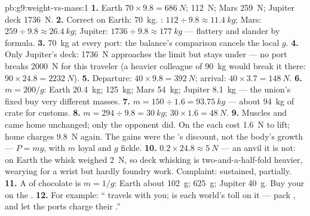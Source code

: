 \begin{solution}{pb:g9:weight-vs-mass:1}
\textbf{1.} Earth $70 \times 9.8 = \qty{686}{N}$; 
\qty{112}{N}; Mars \qty{259}{N}; Jupiter deck
\qty{1736}{N}.
\textbf{2.} Correct on Earth: \qty{70}{kg}. : $112 \div
9.8 \approx \qty{11.4}{kg}$; Mars: $259 \div 9.8 \approx
\qty{26.4}{kg}$; Jupiter: $1736 \div 9.8 \approx
\qty{177}{kg}$ --- flattery and slander by formula.
\textbf{3.} \qty{70}{kg} at every port: the balance's
comparison cancels the local $g$.
\textbf{4.} Only Jupiter's deck: \qty{1736}{N} approaches the
limit but stays under --- no port breaks \qty{2000}{N} for
this traveler (a heavier colleague of \qty{90}{kg} would
break it there: $90 \times 24.8 = \qty{2232}{N}$).
\textbf{5.} Departure: $40 \times 9.8 = \qty{392}{N}$;
arrival: $40 \times 3.7 = \qty{148}{N}$.
\textbf{6.} $m = 200/g$: Earth \qty{20.4}{kg}; 
\qty{125}{kg}; Mars \qty{54}{kg}; Jupiter \qty{8.1}{kg} ---
the union's fixed  buy very different masses.
\textbf{7.} $m = 150 \div 1.6 = \qty{93.75}{kg}$ --- about
\qty{94}{kg} of crate for customs.
\textbf{8.} $m = 294 \div 9.8 = \qty{30}{kg}$;  
$30 \times 1.6 = \qty{48}{N}$.
\textbf{9.} Muscles and  came home unchanged; only the
opponent did. On the  each  cost \qty{1.6}{N} to
lift; home charges \qty{9.8}{N} again. The gains were the
's discount, not the body's growth --- $P = m g$, with
$m$ loyal and $g$ fickle.
\textbf{10.} $0.2 \times 24.8 \approx \qty{5}{N}$ --- an
anvil it is not: on Earth the whisk weighed \qty{2}{N}, so
deck whisking is two-and-a-half-fold heavier, wearying for a
wrist but hardly foundry work. Complaint: sustained,
partially.
\textbf{11.} A  of chocolate is $m = 1/g$: Earth about
\qty{102}{g};  \qty{625}{g}; Jupiter \qty{40}{g}. Buy
your  on the .
\textbf{12.} For example: `` travels with you;  is
each world's toll on it --- pack , and let the
ports charge their .''
\end{solution}
